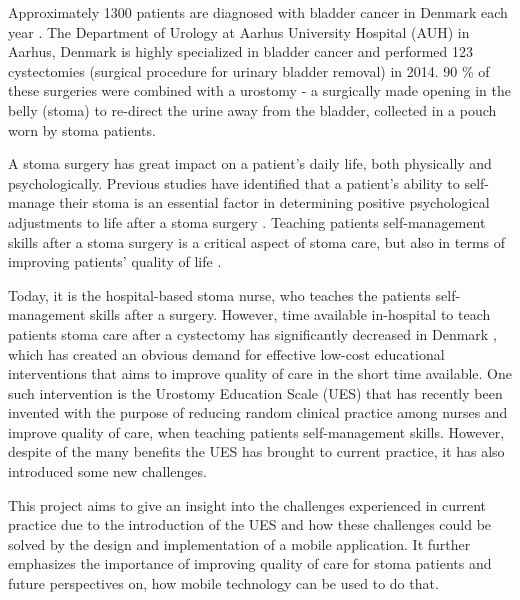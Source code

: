 
Approximately 1300 patients are diagnosed with bladder cancer in Denmark each year \citep{bladderregristry}. The Department of Urology at Aarhus University Hospital (AUH) in Aarhus, Denmark is highly specialized in bladder cancer and performed 123 cystectomies (surgical procedure for urinary bladder removal) in 2014. 90 \% of these surgeries were combined with a urostomy \citep{louise} - a  surgically made opening in the belly (stoma) to re-direct the urine away from the bladder, collected in a pouch worn by stoma patients. 

A stoma surgery has great impact on a patient's daily life, both physically and psychologically. Previous studies have identified that a patient's ability to self-manage their stoma is an essential factor in determining positive psychological adjustments to life after a stoma surgery \citep{piwonka}. Teaching patients self-management skills after a stoma surgery is a critical aspect of stoma care, but also in terms of improving patients' quality of life  \citep{piwonka, white1997}. 

Today, it is the hospital-based stoma nurse, who teaches the patients self-management skills after a surgery. However, time available in-hospital to teach patients stoma care after a cystectomy has significantly decreased in Denmark \citep{jensen_validation}, which has created an obvious demand for effective low-cost educational interventions that aims to improve quality of care in the short time available. One such intervention is the Urostomy Education Scale (UES) that has recently been invented with the purpose of reducing random clinical practice among nurses and improve quality of care, when teaching patients self-management skills. However, despite of the many benefits the UES has brought to current practice, it has also introduced some new challenges.

This project aims to give an insight into the challenges experienced in current practice due to the introduction of the UES and how these challenges could be solved by the design and implementation of a mobile application. It further emphasizes the importance of improving quality of care for stoma patients and future perspectives on, how mobile technology can be used to do that.  


